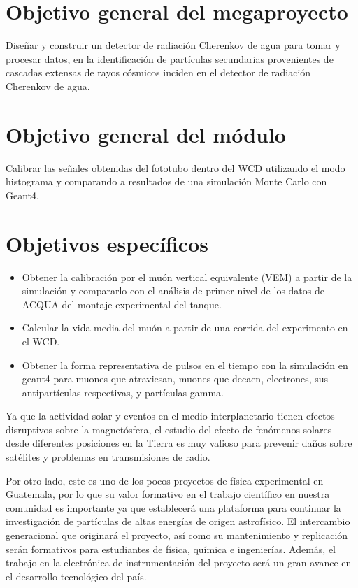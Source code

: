 \documentclass{book}
\begin{document}

\section{Objetivo general del megaproyecto}
Dise\~nar y construir un detector de radiaci\'on Cherenkov de agua para tomar y procesar datos, en la identificaci\'on de part\'iculas secundarias provenientes de cascadas extensas de rayos c\'osmicos inciden en el detector de radiaci\'on Cherenkov de agua.
\section{Objetivo general del m\'odulo}
Calibrar las se\~nales obtenidas del fototubo dentro del WCD utilizando el modo histograma y comparando a resultados de una simulaci\'on Monte Carlo con Geant4.
\section{Objetivos espec\'ificos}
\begin{itemize}
 \item Obtener la calibraci\'on por el mu\'on vertical equivalente (VEM) a partir de la simulaci\'on y compararlo con el an\'alisis de primer nivel de los datos de ACQUA del montaje experimental del tanque.
 \item Calcular la vida media del mu\'on a partir de una corrida del experimento en el WCD.
 \item Obtener la forma representativa de pulsos en el tiempo con la simulaci\'on en geant4 para muones que atraviesan, muones que decaen, electrones, sus antipartículas respectivas, y partículas gamma.
\end{itemize}



Ya que la actividad solar y eventos en el medio interplanetario tienen efectos disruptivos sobre la magnet\'osfera, el estudio del efecto de fen\'omenos solares desde diferentes posiciones en la Tierra es muy valioso para prevenir da\~nos sobre sat\'elites y problemas en transmisiones de radio.

Por otro lado, este es uno de los pocos proyectos de f\'isica experimental en Guatemala, por lo que su valor formativo en el trabajo cient\'ifico en nuestra comunidad es importante ya que establecer\'a una plataforma para continuar la investigaci\'on de part\'iculas de altas energ\'ias de origen astrof\'isico. El intercambio generacional que originar\'a el proyecto, as\'i como su mantenimiento y replicaci\'on ser\'an formativos para estudiantes de f\'isica, qu\'imica e ingenier\'ias. Adem\'as, el trabajo en la electr\'onica de instrumentaci\'on del proyecto ser\'a un gran avance en el desarrollo tecnol\'ogico del pa\'is.
\end{document}
